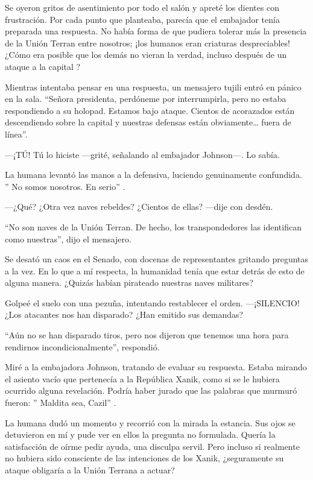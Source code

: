 Se oyeron gritos de asentimiento por todo el salón y apreté los dientes con frustración. Por cada punto que planteaba, parecía que el embajador tenía preparada una respuesta. No había forma de que pudiera tolerar más la presencia de la Unión Terran entre nosotros; ¡los humanos eran criaturas despreciables! ¿Cómo era posible que los demás no vieran la verdad, incluso después de un ataque a la capital ?

Mientras intentaba pensar en una respuesta, un mensajero tujili entró en pánico en la sala. ``Señora presidenta, perdóneme por interrumpirla, pero no estaba respondiendo a su holopad. Estamos bajo ataque. Cientos de acorazados están descendiendo sobre la capital y nuestras defensas están obviamente… fuera de línea''.

—¡TÚ! Tú lo hiciste —grité, señalando al embajador Johnson—. Lo sabía.

La humana levantó las manos a la defensiva, luciendo genuinamente confundida. ''
No somos nosotros. En serio''
.

—¿Qué? ¿Otra vez naves rebeldes? ¿Cientos de ellas? —dije con desdén.

``No son naves de la Unión Terran. De hecho, los transpondedores las identifican como nuestras'', dijo el mensajero.

Se desató un caos en el Senado, con docenas de representantes gritando preguntas a la vez. En lo que a mí respecta, la humanidad tenía que estar detrás de esto de alguna manera. ¿Quizás habían pirateado nuestras naves militares?

Golpeé el suelo con una pezuña, intentando restablecer el orden. —¡SILENCIO! ¿Los atacantes nos han disparado? ¿Han emitido sus demandas?

``Aún no se han disparado tiros, pero nos dijeron que tenemos una hora para rendirnos incondicionalmente'', respondió.

Miré a la embajadora Johnson, tratando de evaluar su respuesta. Estaba mirando el asiento vacío que pertenecía a la República Xanik, como si se le hubiera ocurrido alguna revelación. Podría haber jurado que las palabras que murmuró fueron: ''
Maldita sea, Cazil''
.

La humana dudó un momento y recorrió con la mirada la estancia. Sus ojos se detuvieron en mí y pude ver en ellos la pregunta no formulada. Quería la satisfacción de oírme pedir ayuda, una disculpa servil. Pero incluso si realmente no hubiera sido consciente de las intenciones de los Xanik, ¿seguramente su ataque obligaría a la Unión Terrana a actuar?

